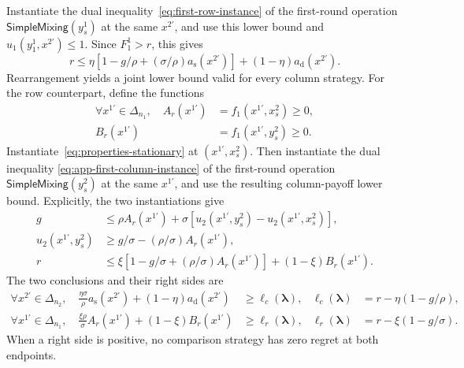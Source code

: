 \documentclass[11pt]{article}
\theoremstyle{remark}
\theoremstyle{plain}
\newcommand{\sm}{\mathsf{SimpleMixing}}
\begin{document}
Instantiate the dual inequality~\eqref{eq:first-row-instance}
of the first-round operation $\sm(y_s^1)$ at the same
$x^{2\prime}$, and use this lower bound and
$u_1(y_1^1,x^{2\prime})\le1$. Since $F_1^1>r$, this gives
\begin{equation}
 r\le\eta[1-g/\rho+(\sigma/\rho)a_{\mathrm s}(x^{2\prime})]
                         +(1-\eta)a_{\mathrm d}(x^{2\prime}).
 \label{eq:app-column-loss-first-row-test}
\end{equation}
Rearrangement yields a joint lower bound valid for every column strategy.
For the row counterpart, define the functions
\begin{equation}
 \begin{aligned}
 \forall x^{1\prime}\in\Delta_{n_1},\quad
 A_r(x^{1\prime})&=f_1(x^{1\prime},x_s^2)\ge0,\\
 B_r(x^{1\prime})&=f_1(x^{1\prime},y_s^2)\ge0.
 \end{aligned}
 \label{eq:app-row-endpoint-losses}
\end{equation}
Instantiate~\eqref{eq:properties-stationary} at
$(x^{1\prime},x_s^2)$. Then instantiate the dual inequality
\eqref{eq:app-first-column-instance} of the first-round operation
$\sm(y_s^2)$ at the same $x^{1\prime}$, and use the resulting
column-payoff lower bound. Explicitly, the two instantiations give
\begin{equation}
 \begin{aligned}
 g&\le\rho A_r(x^{1\prime})
       +\sigma[u_2(x^{1\prime},y_s^2)-u_2(x^{1\prime},x_s^2)],\\
 u_2(x^{1\prime},y_s^2)
       &\ge g/\sigma-(\rho/\sigma)A_r(x^{1\prime}),\\
 r&\le\xi[1-g/\sigma+(\rho/\sigma)A_r(x^{1\prime})]
                         +(1-\xi)B_r(x^{1\prime}).
 \end{aligned}
 \label{eq:app-row-loss-tests}
\end{equation}
The two conclusions and their right sides are
\begin{equation}
 \begin{aligned}
 \forall x^{2\prime}\in\Delta_{n_2},\quad
 \frac{\eta\sigma}{\rho}a_{\mathrm s}(x^{2\prime})
       +(1-\eta)a_{\mathrm d}(x^{2\prime})&\ge\ell_c(\boldsymbol\lambda),&
 \ell_c(\boldsymbol\lambda)&=r-\eta(1-g/\rho),\\
 \forall x^{1\prime}\in\Delta_{n_1},\quad
 \frac{\xi\rho}{\sigma}A_r(x^{1\prime})
       +(1-\xi)B_r(x^{1\prime})&\ge\ell_r(\boldsymbol\lambda),&
 \ell_r(\boldsymbol\lambda)&=r-\xi(1-g/\sigma).
 \end{aligned}
 \label{eq:app-joint-endpoint-loss-bounds}
\end{equation}
When a right side is positive, no comparison strategy has zero
regret at both endpoints.
\end{document}

